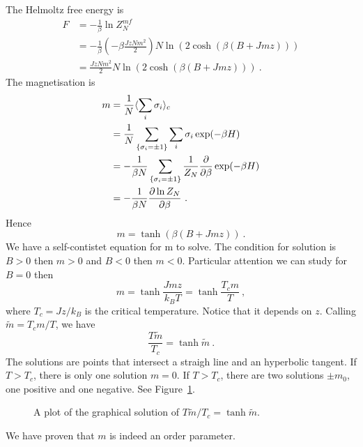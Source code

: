     The Helmoltz free energy is 
    \begin{equation*}
    \begin{aligned}
        F & = - \frac{1}{\beta} \ln Z_N^{mf} \\ & = - \frac{1}{\beta} (- \beta \frac{J z N m^2}{2}) N \ln (2 \cosh (\beta (B + Jmz))) \\ & = \frac{J z N m^2}{2} N \ln (2 \cosh (\beta (B + Jmz))) ~.
    \end{aligned}
    \end{equation*}
    The magnetisation is 
    \begin{equation*}
    \begin{aligned}
         m & = \frac{1}{N} \langle\sum_i \sigma_i\rangle_c \\ & = \frac{1}{N} \sum_{\{\sigma_i = \pm 1\}} \sum_i \sigma_i \exp(- \beta H) \\ & = - \frac{1}{\beta N} \sum_{\{\sigma_i = \pm 1\}} \frac{1}{Z_N} \frac{\partial}{\partial\beta} \exp(- \beta H) \\ & = - \frac{1}{\beta N} \frac{\partial\ln Z_N}{\partial\beta} ~.
    \end{aligned}
    \end{equation*}
    Hence 
    \begin{equation*}
        m = \tanh (\beta (B + J m z)) ~.
    \end{equation*}
    We have a self-contistet equation for m to solve. The condition for solution is $B >0$ then $m > 0$ and $B < 0$ then $m < 0$. Particular attention we can study for $B = 0$ then 
    \begin{equation*}
        m = \tanh \frac{J m z}{k_B T} = \tanh \frac{T_c m}{T} ~,
    \end{equation*}
    where $T_c = J z / k_B$ is the critical temperature. Notice that it depends on $z$. Calling $\tilde m = T_c m / T$, we have 
    \begin{equation*}
        \frac{T \tilde m}{T_c} = \tanh \tilde m ~.
    \end{equation*}
    The solutions are points that intersect a straigh line and an hyperbolic tangent. If $T > T_c$, there is only one solution $m = 0$. If $T > T_c$, there are two solutions $\pm m_0$, one positive and one negative. See Figure~\ref{mf:m}.
    \begin{figure}
        \centering
        \caption{A plot of the graphical solution of $T \tilde m / T_c = \tanh \tilde m$.}
        \label{mf:m}
    \end{figure}
    We have proven that $m$ is indeed an order parameter. 
    
